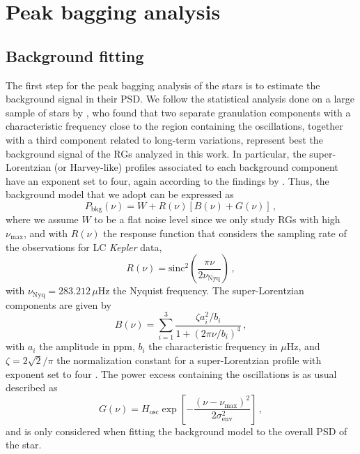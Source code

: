 \documentclass[structabstract]{aa}
\newcommand{\kepler}{\textit{Kepler} }
\newcommand{\numax}{\nu_\mathrm{max}}
\newcommand{\muhz}{$\mu$Hz}
\begin{document}
\section{Peak bagging analysis}
\label{sec:pb}

\subsection{Background fitting}
\label{sec:bkg}
The first step for the peak bagging analysis of the stars is to estimate the background signal in their PSD. We follow the statistical analysis done on a large sample of stars by \cite{Kallinger14}, who found that two separate granulation components with a characteristic frequency close to the region containing the oscillations, together with a third component related to long-term variations, represent best the background signal of the RGs analyzed in this work. In particular, the super-Lorentzian (or Harvey-like) profiles associated to each background component have an exponent set to four, again according to the findings by \cite{Kallinger14}. Thus, the background model that we adopt can be expressed as
\begin{equation}
P_\mathrm{bkg} \left(\nu \right) = W + R \left( \nu \right) \left[ B\left( \nu \right) + G \left( \nu \right) \right] \, ,
\label{eq:overall_bkg}
\end{equation}
where we assume $W$ to be a flat noise level since we only study RGs with high $\numax$, and with $R\left(\nu\right)$ the response function that considers the sampling rate of the observations for LC \kepler data,
\begin{equation}
R\left( \nu \right) = \mbox{sinc}^2 \left( \frac{\pi \nu}{2 \nu_\mathrm{Nyq}} \right) \, ,
\label{eq:resp}
\end{equation}
with $\nu_\mathrm{Nyq} = 283.212\,\mu$Hz the Nyquist frequency. The super-Lorentzian components are given by
\begin{equation}
B\left(\nu\right) = \sum^3_{i=1} \frac{\zeta a^2_i / b_i}{1 + \left( 2 \pi \nu / b_i \right)^4} \, ,
\label{eq:bkg}
\end{equation}
with $a_i$ the amplitude in ppm, $b_i$ the characteristic frequency in \muhz, and $\zeta = 2\sqrt{2}/\pi$ the normalization constant for a super-Lorentzian profile with exponent set to four \citep[e.g. see][]{Karoff13,Kallinger14}.
The power excess containing the oscillations is as usual described as
\begin{equation}
G\left(\nu\right) = H_\mathrm{osc} \exp \left[ - \frac{ \left( \nu - \nu_\mathrm{max} \right)^2}{2 \sigma_\mathrm{env}^2} \right] \, ,
\label{eq:env}
\end{equation}
and is only considered when fitting the background model to the overall PSD of the star.
\end{document}
